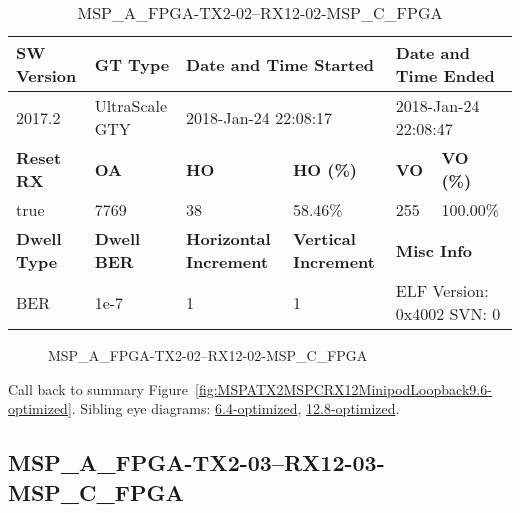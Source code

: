 \begin{table}[h]
\centering
\caption{MSP\_A\_FPGA-TX2-02--RX12-02-MSP\_C\_FPGA}
\label{tab:MSPAFPGATX202RX1202MSPCFPGA9.6-optimized}
\begin{tabular}{@{}|l|l|l|l|l|l|@{}}
\toprule
\textbf{SW Version}                & \textbf{GT Type}   & \multicolumn{2}{l|}{\textbf{Date and Time Started}}            & \multicolumn{2}{l|}{\textbf{Date and Time Ended}}        \\ \midrule
2017.2                       & UltraScale GTY          & \multicolumn{2}{l|}{2018-Jan-24 22:08:17}                   & \multicolumn{2}{l|}{2018-Jan-24 22:08:47}               \\ \midrule
\textbf{Reset RX}                  & \textbf{OA} & \textbf{HO}   & \textbf{HO (\%)} & \textbf{VO} & \textbf{VO (\%)} \\ \midrule
true & 7769        & 38          & 58.46\%        & 255        & 100.00\%       \\ \midrule
\textbf{Dwell Type}                & \textbf{Dwell BER} & \textbf{Horizontal Increment} & \textbf{Vertical Increment}    & \multicolumn{2}{l|}{\textbf{Misc Info}}                  \\ \midrule
BER                            & 1e-7        & 1        & 1           & \multicolumn{2}{l|}{ELF Version: 0x4002 SVN: 0}                         \\ \bottomrule
\end{tabular}
\end{table}

\begin{figure}[h]
\caption{MSP\_A\_FPGA-TX2-02--RX12-02-MSP\_C\_FPGA} \label{fig:MSPAFPGATX202RX1202MSPCFPGA9.6-optimized}
\end{figure}

Call back to summary Figure~\ref{fig:MSPATX2MSPCRX12MinipodLoopback9.6-optimized}.
Sibling eye diagrams: \hyperref[sec:MSPAFPGATX202RX1202MSPCFPGA6.4-optimized]{6.4-optimized}, \hyperref[sec:MSPAFPGATX202RX1202MSPCFPGA12.8-optimized]{12.8-optimized}.

\clearpage
\newpage


\subsection{MSP\_A\_FPGA-TX2-03--RX12-03-MSP\_C\_FPGA}\label{sec:MSPAFPGATX203RX1203MSPCFPGA9.6-optimized}

